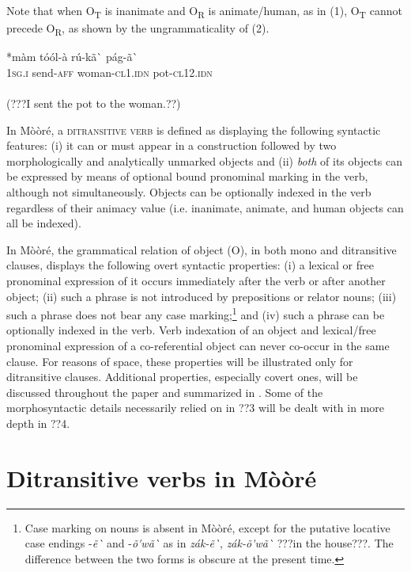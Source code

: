 \documentclass[output=paper]{langsci/langscibook}
\begin{document}
Note that when O\textsubscript{T} is inanimate and O\textsubscript{R} is animate/human, as in (1), O\textsubscript{T} cannot precede O\textsubscript{R}, as shown by the ungrammaticality of (2).


\ea \gll 
\label{bkm:Ref444692191}*màm  tóól-à    rú-kã\`{ }      pág-ã\`{ }
\\
%
\textsc{1sg.i}    send-\textsc{aff}  woman-\textsc{cl1.idn}  pot-\textsc{cl12.idn}
\\\\\glt
(???I sent the pot to the woman.??)
\z

In Mòòré, a \textsc{ditransitive verb} is defined as displaying the following syntactic features: (i) it can or must appear in a construction followed by two morphologically and analytically unmarked objects and (ii) \textit{both} of its objects can be expressed by means of optional bound pronominal marking in the verb, although not simultaneously. Objects can be optionally indexed in the verb regardless of their animacy value (i.e. inanimate, animate, and human objects can all be indexed).

In Mòòré, the grammatical relation of object (O), in both mono and ditransitive clauses, displays the following overt syntactic properties: (i) a lexical or free pronominal expression of it occurs immediately after the verb or after another object; (ii) such a phrase is not introduced by prepositions or relator nouns; (iii) such a phrase does not bear any case marking;\footnote{ Case marking on nouns is absent in Mòòré, except for the putative locative case endings -\textit{ẽ\`{ } }and -\textit{\~{o}\'{ }wã\`{ }} as in \textit{zák-ẽ\`{ }}, \textit{zák-\~{o}\'{ }wã\`{ }} ???in the house???. The difference between the two forms is obscure at the present time.  }{ }and (iv) such a phrase can be optionally indexed in the verb. Verb indexation of an object and lexical/free pronominal expression of a co-referential object can never co-occur in the same clause. For reasons of space, these properties will be illustrated only for ditransitive clauses. Additional properties, especially covert ones, will be discussed throughout the paper and summarized in . Some of the morphosyntactic details necessarily relied on in ??3 will be dealt with in more depth in ??4.

\section{Ditransitive verbs in Mòòré}
\end{document}
